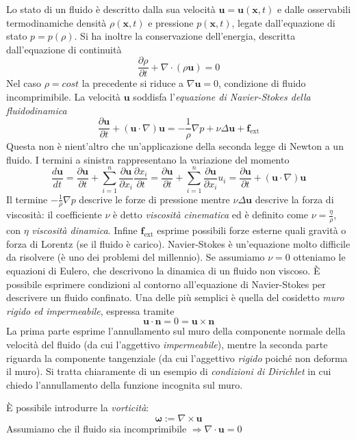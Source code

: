 \documentclass[a4paper,11pt]{report}
\newcommand{\vect}[1]{\boldsymbol{#1}}
\newcommand{\x}{\boldsymbol{x}}
\begin{document}
Lo stato di un fluido \`e descritto dalla sua velocit\`a $\vect{u}=\vect{u}(\x,t)$ e dalle osservabili termodinamiche densit\`a $\rho(\x, t)$ e pressione $p(\x,t)$, legate dall'equazione di stato $p=p(\rho)$.
Si ha inoltre la conservazione dell'energia, descritta dall'equazione di continuit\`a
\[
\frac{\partial \rho}{\partial t}+\nabla \cdot (\rho \vect{u})=0
\]
Nel caso $\rho=cost$ la precedente si riduce a $\nabla \vect{u}=0$, condizione di fluido incomprimibile.
La velocit\`a $\vect{u}$ soddisfa l'\emph{equazione di Navier-Stokes della fluidodinamica}
\[
\frac{\partial \vect{u}}{\partial t}+(\vect{u}\cdot \nabla) \vect{u}=-\frac{1}{\rho}\nabla p + \nu \Delta \vect{u} + \vect{f}_\text{ext}
\]
Questa non \`e nient'altro che un'applicazione della seconda legge di Newton a un fluido.
I termini a sinistra rappresentano la variazione del momento
\[
\frac{d \vect{u}}{d t} = \frac{\partial \vect{u}}{\partial t} + \sum_{i=1}^n \frac{\partial \vect{u}}{\partial x_i} \frac{\partial x_i}{\partial t} = \frac{\partial \vect{u}}{\partial t} + \sum_{i=1}^n \frac{\partial \vect{u}}{\partial x_i} u_i=\frac{\partial \vect{u}}{\partial t}+(\vect{u}\cdot \nabla) \vect{u}
\]
Il termine $-\frac{1}{\rho}\nabla p$ descrive le forze di pressione mentre $\nu \Delta \vect{u}$ descrive la forza di viscosit\`a:
il coefficiente $\nu$ \`e detto \emph{viscosit\`a cinematica} ed \`e definito come $\nu=\frac{\eta}{\rho}$, con $\eta$ \emph{viscosit\`a dinamica}.
Infine $\vect{f}_\text{ext}$ esprime possibili forze esterne quali gravit\`a o forza di Lorentz (se il fluido \`e carico).
Navier-Stokes \`e un'equazione molto difficile da risolvere (\`e uno dei problemi del millennio).
Se assumiamo $\nu=0$ otteniamo le equazioni di Eulero, che descrivono la dinamica di un fluido non viscoso.
\`E possibile esprimere condizioni al contorno all'equazione di Navier-Stokes per descrivere un fluido confinato.
Una delle pi\`u semplici \`e quella del cosidetto \emph{muro rigido ed impermeabile}, espressa tramite
\[
\vect{u}\cdot \vect{n}=0=\vect{u}\times \vect{n}
\]
La prima parte esprime l'annullamento sul muro della componente normale della velocit\`a del fluido (da cui l'aggettivo \emph{impermeabile}), mentre la seconda parte riguarda la componente tangenziale (da cui l'aggettivo \emph{rigido} poich\'e non deforma il muro).
Si tratta chiaramente di un esempio di \emph{condizioni di Dirichlet} in cui chiedo l'annullamento della funzione incognita sul muro.

\medskip

\`E possibile introdurre la \emph{vorticit\`a}:
\[
\vect{\omega}:=\nabla \times \vect{u}
\]
Assumiamo che il fluido sia incomprimibile $\Rightarrow \nabla \cdot \vect{u}=0$
\end{document}
